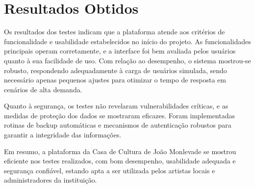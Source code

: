 \section{Resultados Obtidos}
Os resultados dos testes indicam que a plataforma atende aos critérios de funcionalidade e usabilidade estabelecidos no início do projeto. As funcionalidades principais operam corretamente, e a interface foi bem avaliada pelos usuários quanto à sua facilidade de uso. Com relação ao desempenho, o sistema mostrou-se robusto, respondendo adequadamente à carga de usuários simulada, sendo necessário apenas pequenos ajustes para otimizar o tempo de resposta em cenários de alta demanda.

Quanto à segurança, os testes não revelaram vulnerabilidades críticas, e as medidas de proteção dos dados se mostraram eficazes. Foram implementadas rotinas de backup automáticas e mecanismos de autenticação robustos para garantir a integridade das informações.

Em resumo, a plataforma da Casa de Cultura de João Monlevade se mostrou eficiente nos testes realizados, com bom desempenho, usabilidade adequada e segurança confiável, estando apta a ser utilizada pelos artistas locais e administradores da instituição.